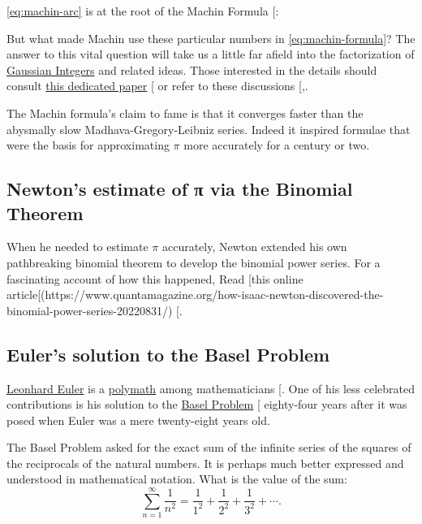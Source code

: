 \documentclass[
  a4paper,
]{article}
\begin{document}
\cref{eq:machin-arc} is at the root of the Machin Formula
{[}\citeproc{ref-machin-like-wiki}{25}{]}:

But what made Machin use these particular numbers in
\cref{eq:machin-formula}? The answer to this vital question will take us
a little far afield into the factorization of
\href{https://en.wikipedia.org/wiki/Gaussian_integer}{Gaussian Integers}
and related ideas. Those interested in the details should consult
\href{https://www2.oberlin.edu/faculty/jcalcut/gausspi.pdf}{this
dedicated paper} {[}\citeproc{ref-calcut2009}{26}{]} or refer to these
discussions
{[},\citeproc{ref-mse-machin-two}{28}{]}.

The Machin formula's claim to fame is that it converges faster than the
abysmally slow Madhava-Gregory-Leibniz series. Indeed it inspired
formulae that were the basis for approximating \(\pi\) more accurately
for a century or two.

\subsection{Newton's estimate of π via the Binomial
Theorem}\label{newtons-estimate-of-ux3c0-via-the-binomial-theorem}

When he needed to estimate \(\pi\) accurately, Newton extended his own
pathbreaking binomial theorem to develop the binomial power series. For
a fascinating account of how this happened, Read {[}this online
article{[}(https://www.quantamagazine.org/how-isaac-newton-discovered-the-binomial-power-series-20220831/)
{[}\citeproc{ref-strogatz-newton-2022}{29}{]}.

\subsection{Euler's solution to the Basel
Problem}\label{eulers-solution-to-the-basel-problem}

\href{https://en.wikipedia.org/wiki/Leonhard_Euler}{Leonhard Euler} is a
\href{https://www.thefreedictionary.com/polymath}{polymath} among
mathematicians {[}\citeproc{ref-euler-dunham-1999}{30}{]}. One of his
less celebrated contributions is his solution to the
\href{https://en.wikipedia.org/wiki/Basel_problem}{Basel Problem}
{[}\citeproc{ref-basel-problem}{31}{]} eighty-four years after it was
posed when Euler was a mere twenty-eight years old.

The Basel Problem asked for the exact sum of the infinite series of the
squares of the reciprocals of the natural numbers. It is perhaps much
better expressed and understood in mathematical notation. What is the
value of the sum: \[
\sum_{n=1}^\infty \frac{1}{n^2} = \frac{1}{1^2} + \frac{1}{2^2} + \frac{1}{3^2} + \cdots.
\]
\end{document}
